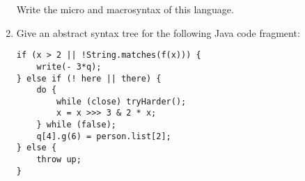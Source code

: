 \documentclass{article}
\begin{document}
\begin{enumerate}
Write the micro and macrosyntax of this language.

\pagebreak
\item Give an abstract syntax tree for the following Java code fragment:
\begin{verbatim}
if (x > 2 || !String.matches(f(x))) {
    write(- 3*q);
} else if (! here || there) {
    do {
        while (close) tryHarder();
        x = x >>> 3 & 2 * x;
    } while (false);
    q[4].g(6) = person.list[2];
} else {
    throw up;
}
\end{verbatim}
\pagebreak
\end{enumerate}
\end{document}
